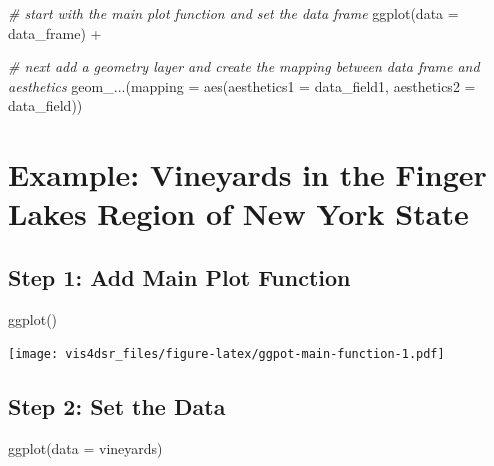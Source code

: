 \documentclass[
]{krantz}
\makeatletter
\newenvironment{Shaded}{\begin{snugshade}}{\end{snugshade}}
\newcommand{\AttributeTok}[1]{\textcolor[rgb]{0.61,0.61,0.61}{#1}}
\newcommand{\CommentTok}[1]{\textcolor[rgb]{0.37,0.37,0.37}{\textit{#1}}}
\newcommand{\FunctionTok}[1]{\textcolor[rgb]{0,0,0}{#1}}
\newcommand{\NormalTok}[1]{#1}
\newcommand{\SpecialCharTok}[1]{\textcolor[rgb]{0,0,0}{#1}}
\newenvironment{kframe}{%
\medskip{}
\setlength{\fboxsep}{.8em}
 \def\at@end@of@kframe{}%
 \ifinner\ifhmode%
  \def\at@end@of@kframe{\end{minipage}}%
  \begin{minipage}{\columnwidth}%
 \fi\fi%
 \def\FrameCommand##1{\hskip\@totalleftmargin \hskip-\fboxsep
 \colorbox{shadecolor}{##1}\hskip-\fboxsep
     \hskip-\linewidth \hskip-\@totalleftmargin \hskip\columnwidth}%
 \MakeFramed {\advance\hsize-\width
   \@totalleftmargin\z@ \linewidth\hsize
   \@setminipage}}%
 {\par\unskip\endMakeFramed%
 \at@end@of@kframe}
\renewenvironment{Shaded}{\begin{kframe}}{\end{kframe}}
\makeatother
\begin{document}
\begin{Shaded}
\begin{Highlighting}[]
\CommentTok{\# start with the main plot function and set the data frame}
\FunctionTok{ggplot}\NormalTok{(}\AttributeTok{data =}\NormalTok{ data\_frame) }\SpecialCharTok{+} 
  
\CommentTok{\# next add a geometry layer and create the mapping between data frame and aesthetics}
  \FunctionTok{geom\_...}\NormalTok{(}\AttributeTok{mapping =} \FunctionTok{aes}\NormalTok{(}\AttributeTok{aesthetics1 =}\NormalTok{ data\_field1, }\AttributeTok{aesthetics2 =}\NormalTok{ data\_field))}
\end{Highlighting}
\end{Shaded}

\hypertarget{example-vineyards-in-the-finger-lakes-region-of-new-york-state}{%
\section{Example: Vineyards in the Finger Lakes Region of New York State}\label{example-vineyards-in-the-finger-lakes-region-of-new-york-state}}

\hypertarget{step-1-add-main-plot-function}{%
\subsection{Step 1: Add Main Plot Function}\label{step-1-add-main-plot-function}}

\begin{Shaded}
\begin{Highlighting}[]
\FunctionTok{ggplot}\NormalTok{()}
\end{Highlighting}
\end{Shaded}

\texttt{[image: vis4dsr\_files/figure-latex/ggpot-main-function-1.pdf]}

\hypertarget{step-2-set-the-data}{%
\subsection{Step 2: Set the Data}\label{step-2-set-the-data}}

\begin{Shaded}
\begin{Highlighting}[]
\FunctionTok{ggplot}\NormalTok{(}\AttributeTok{data =}\NormalTok{ vineyards)}
\end{Highlighting}
\end{Shaded}
\end{document}
